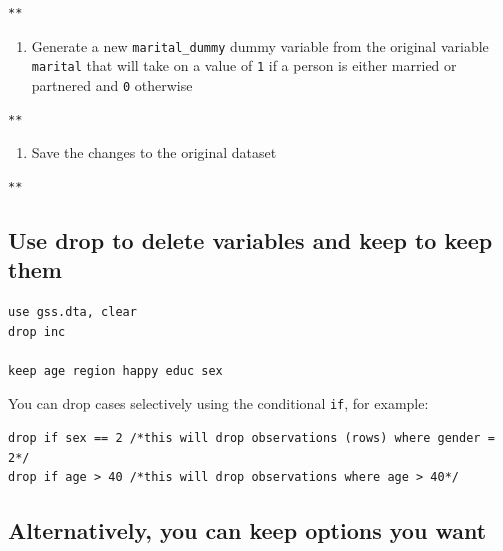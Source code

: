 \documentclass[]{book}
\providecommand{\tightlist}{%
  \setlength{\itemsep}{0pt}\setlength{\parskip}{0pt}}
\begin{document}
\begin{verbatim}
**
\end{verbatim}

\begin{enumerate}
\def\labelenumi{\arabic{enumi}.}
\setcounter{enumi}{2}
\tightlist
\item
  Generate a new \texttt{marital\_dummy} dummy variable from the original variable \texttt{marital} that will take on a value of \texttt{1} if a person is either married or partnered and \texttt{0} otherwise
\end{enumerate}

\begin{verbatim}
**
\end{verbatim}

\begin{enumerate}
\def\labelenumi{\arabic{enumi}.}
\setcounter{enumi}{3}
\tightlist
\item
  Save the changes to the original dataset
\end{enumerate}

\begin{verbatim}
**
\end{verbatim}

\hypertarget{use-drop-to-delete-variables-and-keep-to-keep-them}{%
\subsection{Use drop to delete variables and keep to keep them}\label{use-drop-to-delete-variables-and-keep-to-keep-them}}

\begin{verbatim}
use gss.dta, clear
drop inc

keep age region happy educ sex
\end{verbatim}

You can drop cases selectively using the conditional \texttt{if}, for example:

\begin{verbatim}
drop if sex == 2 /*this will drop observations (rows) where gender = 2*/
drop if age > 40 /*this will drop observations where age > 40*/
\end{verbatim}

\hypertarget{alternatively-you-can-keep-options-you-want}{%
\subsection{Alternatively, you can keep options you want}\label{alternatively-you-can-keep-options-you-want}}
\end{document}
